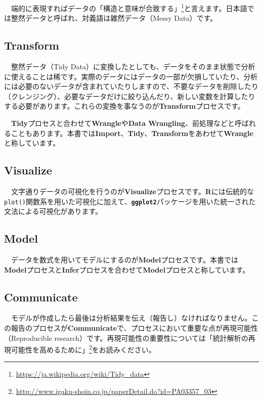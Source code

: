 \documentclass[
  12pt,
]{book}
\DeclareRobustCommand{\href}[2]{#2\footnote{\url{#1}}}
\begin{document}
　端的に表現すればデータの\href{https://ja.wikipedia.org/wiki/Tidy_data}{「構造と意味が合致する」}と言えます。日本語では整然データと呼ばれ、対義語は雑然データ（Messy Data）です。

\hypertarget{transform}{%
\subsection*{Transform}\label{transform}}

　整然データ（Tidy Data）に変換したとしても、データをそのまま状態で分析に使えることは稀です。実際のデータにはデータの一部が欠損していたり、分析には必要のないデータが含まれていたりしますので、不要なデータを削除したり（クレンジング）、必要なデータだけに絞り込んだり、新しい変数を計算したりする必要があります。これらの変換を事なうのが\textbf{Transform}プロセスです。

　\textbf{Tidy}プロセスと合わせて\textbf{Wrangle}や\textbf{Data Wrangling}、前処理などと呼ばれることもあります。本書では\textbf{Import}、\textbf{Tidy}、\textbf{Transform}をあわせて\textbf{Wrangle}と称しています。

\hypertarget{visualize}{%
\subsection*{Visualize}\label{visualize}}

　文字通りデータの可視化を行うのが\textbf{Visualize}プロセスです。\textbf{R}には伝統的な\texttt{plot()}関数系を用いた可視化に加えて、\textbf{\texttt{ggplot2}}パッケージを用いた統一された文法による可視化があります。

\hypertarget{model}{%
\subsection*{Model}\label{model}}

　データを数式を用いてモデルにするのが\textbf{Model}プロセスです。本書では\textbf{Model}プロセスと\textbf{Infer}プロセスを合わせて\textbf{Model}プロセスと称しています。

\hypertarget{communicate}{%
\subsection*{Communicate}\label{communicate}}

　モデルが作成したら最後は分析結果を伝え（報告し）なければなりません。この報告のプロセスが\textbf{Communicate}で、プロセスにおいて重要な点が再現可能性（Reproducible research）です。再現可能性の重要性については\href{http://www.igaku-shoin.co.jp/paperDetail.do?id=PA03357_03}{「統計解析の再現可能性を高めるために」}をお読みください。
\end{document}
